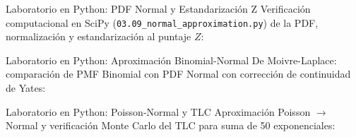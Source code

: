 \documentclass[10pt, aspectratio=169]{beamer}
\begin{document}
\begin{frame}[fragile]{Laboratorio en Python: PDF Normal y Estandarización Z}
  \scriptsize
  Verificación computacional en SciPy (\texttt{03.09\_normal\_approximation.py}) de la PDF, normalización y estandarización al puntaje $Z$:
  \vspace{0.05cm}
  {
  }
\end{frame}

\begin{frame}[fragile]{Laboratorio en Python: Aproximación Binomial-Normal}
  \scriptsize
  De Moivre-Laplace: comparación de PMF Binomial con PDF Normal con corrección de continuidad de Yates:
  \vspace{0.02cm}
  {
  }
\end{frame}

\begin{frame}[fragile]{Laboratorio en Python: Poisson-Normal y TLC}
  \scriptsize
  Aproximación Poisson $\to$ Normal y verificación Monte Carlo del TLC para suma de 50 exponenciales:
  \vspace{0.02cm}
  {
  }
\end{frame}
\end{document}
